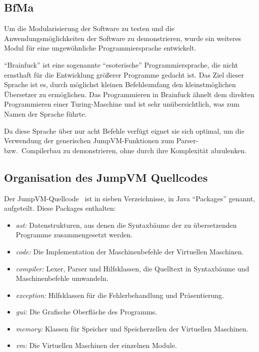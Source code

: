 \documentclass[german, a4paper, parskip, bibliography=totoc]{scrartcl}
\begin{document}
\subsection{BfMa}
Um die Modularisierung der Software zu testen und die Anwendungsmöglichkeiten
der Software zu demonstrieren, wurde ein weiteres Modul für eine
ungewöhnliche Programmiersprache entwickelt.

\enquote{Brainfuck} ist eine sogenannte \enquote{esoterische}
Programmiersprache, die nicht ernsthaft für die Entwicklung größerer
Programme gedacht ist. Das Ziel dieser Sprache ist es, durch möglichst kleinen
Befehlsumfang den kleinstmöglichen Übersetzer zu ermöglichen. Das Programmieren
in Brainfuck ähnelt dem direkten Programmieren einer Turing-Maschine und
ist sehr unübersichtlich, was zum Namen der Sprache führte.

Da diese Sprache über nur acht Befehle verfügt eignet sie sich optimal, um die
Verwendung der generischen JumpVM-Funktionen zum Parser- bzw.\ Compilerbau zu
demonstrieren, ohne durch ihre Komplexität abzulenken.


\subsection{Organisation des JumpVM Quellcodes}

Der JumpVM-Quellcode~\cite{url_jumpvm} ist in sieben Verzeichnisse, in Java
\enquote{Packages} genannt, aufgeteilt. Diese Packages enthalten:

\begin{itemize}
\item \emph{ast:}
    Datenstrukturen, aus denen die Syntaxbäume der zu übersetzenden Programme
    zusammengesetzt werden.
\item \emph{code:}
    Die Implementation der Maschinenbefehle der Virtuellen Maschinen.
\item \emph{compiler:}
    Lexer, Parser und Hilfsklassen, die Quelltext in Syntaxbäume und
    Maschinenbefehle umwandeln.
\item \emph{exception:}
    Hilfsklassen für die Fehlerbehandlung und Präsentierung.
\item \emph{gui:}
    Die Grafische Oberfläche des Programms.
\item \emph{memory:}
    Klassen für Speicher und Speicherzellen der Virtuellen Maschinen.
\item \emph{vm:}
    Die Virtuellen Maschinen der einzelnen Module.
\end{itemize}
\end{document}
